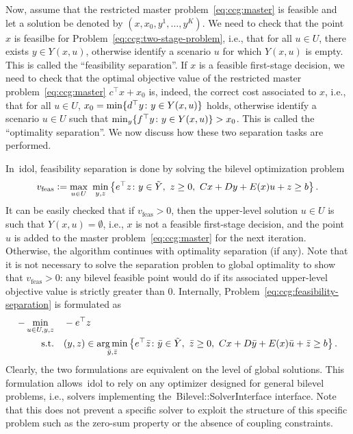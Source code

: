Now, assume that the restricted master problem~\eqref{eq:ccg:master} is
feasible and let a solution be denoted by $(x,x_0,y^1,\dotsc,y^K)$. We need to
check that the point $x$ is feasilbe for
Problem~\eqref{eq:ccg:two-stage-problem}, i.e., that for all $u\in U$, there
exists $y\in Y(x,u)$, otherwise identify a scenario $u$ for which $Y(x,u)$ is
empty. This is called the ``feasibility separation''. If $x$ is a feasible
first-stage decision, we need to check that the optimal objective value of the
restricted master problem~\eqref{eq:ccg:master} $c^\top x + x_0$ is, indeed,
the correct cost associated to $x$, i.e., that for all $u\in U$, $x_0 =
\min\{d^\top y\colon y\in Y(x,u)\}$ holds, otherwise identify a scenario $u\in
U$ such that $\min_y\{ f^\top y \colon y\in Y(x,u) \} > x_0$. This is called
the ``optimality separation''. We now discuss how these two separation tasks
are performed.

In~\textsf{idol}, feasibility separation is done by solving the bilevel
optimization problem
%
\begin{equation}
    \label{eq:ccg:feasibility-separation}
    v_\text{feas} \mathrel{{\mathop:}{=}} \max_{u\in U} \ \min_{y,z} \left\{ e^\top z \colon
        y\in\tilde{Y}, \ z\ge 0, \ Cx + Dy + E(x)u + z \ge b
    \right\}.
\end{equation}
It can be easily checked that if $v_\text{feas} > 0$, then the upper-level
solution $u\in U$ is such that $Y(x,u) = \emptyset$, i.e., $x$ is not a
feasible first-stage decision, and the point $u$ is added to the master
problem~\eqref{eq:ccg:master} for the next iteration. Otherwise, the algorithm
continues with optimality separation (if any). Note that it is not necessary
to solve the separation problen to global optimality to show that
$v_\text{feas} > 0$: any bilevel feasible point would do if its associated
upper-level objective value is strictly greater than 0. Internally,
Problem~\eqref{eq:ccg:feasibility-separation} is formulated as
%
\begin{align*}
    - \min_{u\in U,y,z} \quad & -e^\top z \\
    \text{s.t.} \quad & (y,z) \in \operatorname*{arg\,min}_{\bar{y},\bar{z}} \left\{ e^\top\bar{z} \colon
        \bar{y}\in\tilde{Y}, \ \bar{z}\ge 0, \ Cx + D\bar{y} + E(x)\bar{u} + \bar{z} \ge b
    \right\}.
\end{align*}
Clearly, the two formulations are equivalent on the level of global solutions.
This formulation allows~\textsf{idol} to rely on any optimizer designed for
general bilevel problems, i.e., solvers implementing
the~\textsf{Bilevel::SolverInterface} interface. Note that this does not
prevent a specific solver to exploit the structure of this specific problem
such as the zero-sum property or the absence of coupling constraints.

